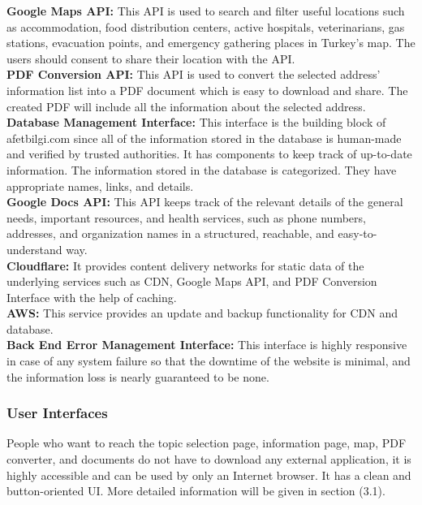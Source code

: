 \documentclass[listof=nochaptergap]{report}
\begin{document}
            \textbf{Google Maps API:} This API is used to search and filter useful locations such as accommodation, food distribution centers, active hospitals, veterinarians, gas stations, evacuation points, and emergency gathering places in Turkey's map. The users should consent to share their location with the API. \\

            \textbf{PDF Conversion API:} This API is used to convert the selected address' information list into a PDF document which is easy to download and share. The created PDF will include all the information about the selected address. \\

            
            \textbf{Database Management Interface:} This interface is the building block of afetbilgi.com since all of the information stored in the database is human-made and verified by trusted authorities. It has components to keep track of up-to-date information. The information stored in the database is categorized. They have appropriate names, links, and details. \\

            
            \textbf{Google Docs API:} This API keeps track of the relevant details of the general needs, important resources, and health services, such as phone numbers, addresses, and organization names in a structured, reachable, and easy-to-understand way. \\

            
            \textbf{Cloudflare:} It provides content delivery networks for static data of the underlying services such as CDN, Google Maps API, and PDF Conversion Interface with the help of caching. \\

            
            \textbf{AWS:} This service provides an update and backup functionality for CDN and database. \\

            \textbf{Back End Error Management Interface:} This interface is highly responsive in case of any system failure so that the downtime of the website is minimal, and the information loss is nearly guaranteed to be none. \\

            
        \subsubsection{User Interfaces}
            People who want to reach the topic selection page, information page, map, PDF converter, and documents do not have to download any external application, it is highly accessible and can be used by only an Internet browser. It has a clean and button-oriented UI. More detailed information will be given in section (3.1). \\
\end{document}
